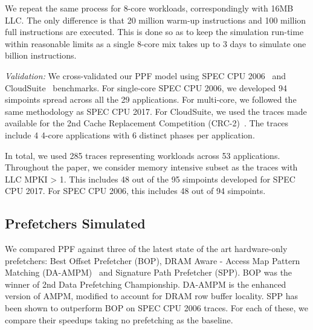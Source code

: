 We repeat the same process for 8-core workloads, correspondingly with 16MB
LLC.  The only difference is that 20 million warm-up instructions and 100
million full instructions are executed.  This is done so as to keep the
simulation run-time within reasonable limits as a single 8-core mix takes up
to 3 days to simulate one billion instructions.

\textit{Validation:} We cross-validated our PPF model using SPEC
CPU 2006~\cite{SPEC2006} and CloudSuite~\cite{CloudSuite} benchmarks.  For
single-core SPEC CPU 2006, we developed 94 simpoints spread across all the 29
applications. For multi-core, we followed the same methodology as SPEC CPU 2017.
For CloudSuite, we used the traces made available for the 2nd Cache
Replacement Competition (CRC-2)~\cite{CRC_2}.  The traces include 4 4-core
applications with 6 distinct phases per application.

In total, we used 285 traces representing workloads across 53 applications.
Throughout the paper, we consider memory intensive subset as the
traces with LLC MPKI > 1.  This includes 48 out of the 95 simpoints
developed for SPEC CPU 2017. For SPEC CPU 2006, this includes 48 out of 94 simpoints.

\subsection{Prefetchers Simulated}
\label{Method-Prefetchers}
We compared PPF against three of the latest state of the art hardware-only
prefetchers: Best Offset Prefetcher (BOP), DRAM Aware - Access Map Pattern
Matching (DA-AMPM)~\cite{DA_AMPM} and Signature Path Prefetcher (SPP).  BOP was
the winner of 2nd Data Prefetching Championship.  DA-AMPM is the enhanced
version of AMPM, modified to account for DRAM row buffer locality.  SPP has
been shown to outperform BOP on SPEC CPU 2006 traces.  For each of these, we
compare their speedups taking no prefetching as the baseline.

